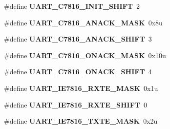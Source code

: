 \begin{DoxyCompactItemize}
\item 
\hypertarget{group___u_a_r_t___register___masks_ga7fe58f80db753fac78feefc4ab257d0d}{}\#define {\bfseries U\+A\+R\+T\+\_\+\+C7816\+\_\+\+I\+N\+I\+T\+\_\+\+S\+H\+I\+F\+T}~2\label{group___u_a_r_t___register___masks_ga7fe58f80db753fac78feefc4ab257d0d}

\item 
\hypertarget{group___u_a_r_t___register___masks_ga7d492736d5d2ffba794d54fa0d6b8d92}{}\#define {\bfseries U\+A\+R\+T\+\_\+\+C7816\+\_\+\+A\+N\+A\+C\+K\+\_\+\+M\+A\+S\+K}~0x8u\label{group___u_a_r_t___register___masks_ga7d492736d5d2ffba794d54fa0d6b8d92}

\item 
\hypertarget{group___u_a_r_t___register___masks_gae5c391d165239e4ed2d80e7ac31a0232}{}\#define {\bfseries U\+A\+R\+T\+\_\+\+C7816\+\_\+\+A\+N\+A\+C\+K\+\_\+\+S\+H\+I\+F\+T}~3\label{group___u_a_r_t___register___masks_gae5c391d165239e4ed2d80e7ac31a0232}

\item 
\hypertarget{group___u_a_r_t___register___masks_ga031dcabb12ed66e1a74a735e962c0418}{}\#define {\bfseries U\+A\+R\+T\+\_\+\+C7816\+\_\+\+O\+N\+A\+C\+K\+\_\+\+M\+A\+S\+K}~0x10u\label{group___u_a_r_t___register___masks_ga031dcabb12ed66e1a74a735e962c0418}

\item 
\hypertarget{group___u_a_r_t___register___masks_ga969b1c4c1e85e7745b73b993b93b4c6f}{}\#define {\bfseries U\+A\+R\+T\+\_\+\+C7816\+\_\+\+O\+N\+A\+C\+K\+\_\+\+S\+H\+I\+F\+T}~4\label{group___u_a_r_t___register___masks_ga969b1c4c1e85e7745b73b993b93b4c6f}

\item 
\hypertarget{group___u_a_r_t___register___masks_gad8d954bf21c5ed93f49c9418f0b1bc5e}{}\#define {\bfseries U\+A\+R\+T\+\_\+\+I\+E7816\+\_\+\+R\+X\+T\+E\+\_\+\+M\+A\+S\+K}~0x1u\label{group___u_a_r_t___register___masks_gad8d954bf21c5ed93f49c9418f0b1bc5e}

\item 
\hypertarget{group___u_a_r_t___register___masks_ga0df3e70bd53348388872ae57a8f7f156}{}\#define {\bfseries U\+A\+R\+T\+\_\+\+I\+E7816\+\_\+\+R\+X\+T\+E\+\_\+\+S\+H\+I\+F\+T}~0\label{group___u_a_r_t___register___masks_ga0df3e70bd53348388872ae57a8f7f156}

\item 
\hypertarget{group___u_a_r_t___register___masks_ga5968d2ee914444772fe2e6fa65ca848b}{}\#define {\bfseries U\+A\+R\+T\+\_\+\+I\+E7816\+\_\+\+T\+X\+T\+E\+\_\+\+M\+A\+S\+K}~0x2u\label{group___u_a_r_t___register___masks_ga5968d2ee914444772fe2e6fa65ca848b}


\end{DoxyCompactItemize}
